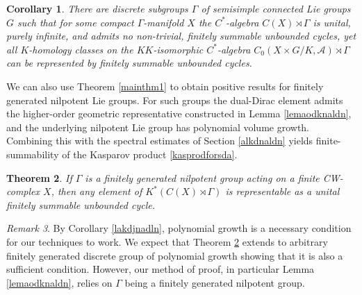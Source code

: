 \documentclass[a4paper,reqno]{amsart}
\numberwithin{equation}{section}
\newtheorem{thm*}{Theorem}
\newtheorem{cor*}[thm*]{Corollary}
\theoremstyle{definition}
\theoremstyle{remark}
\newtheorem{remark*}[thm*]{Remark}
\begin{document}
\begin{cor*}
There are discrete subgroups $\Gamma$ of semisimple connected Lie groups $G$ such that for some compact $\Gamma$-manifold $X$ the $C^*$-algebra $C(X)\rtimes \Gamma$ is unital, purely infinite, and admits no non-trivial, finitely summable unbounded cycles, yet all $K$-homology classes on the $KK$-isomorphic $C^*$-algebra $C_0(X\times G/K,\mathcal{A})\rtimes \Gamma$ can be represented by finitely summable unbounded cycles.
\end{cor*}







We can also use Theorem  \ref{mainthm1} to obtain positive results for finitely generated nilpotent Lie groups. For such groups the dual-Dirac element admits the
higher-order geometric representative constructed in Lemma \ref{lemaodknaldn}, and the underlying nilpotent Lie group has polynomial volume growth. Combining this with the spectral estimates of Section \ref{alkdnaldn} yields finite-summability of the Kasparov product \eqref{kasprodforsda}.


\begin{thm*}
\label{mainthm3}
If $\Gamma$ is a finitely generated nilpotent group acting on a finite CW-complex $X$, then any element of $K^*(C(X)\rtimes \Gamma)$ is representable as a unital finitely summable unbounded cycle.
\end{thm*}

\begin{remark*}
By Corollary \ref{lakdjnadln}, polynomial growth is a necessary condition for our techniques to work.  We expect that Theorem \ref{mainthm3} extends to arbitrary finitely generated discrete group of polynomial growth showing that it is also a sufficient condition. However, our method of proof, in particular Lemma \ref{lemaodknaldn}, relies on $\Gamma$ being a finitely generated nilpotent group. 
\end{remark*}
\end{document}
